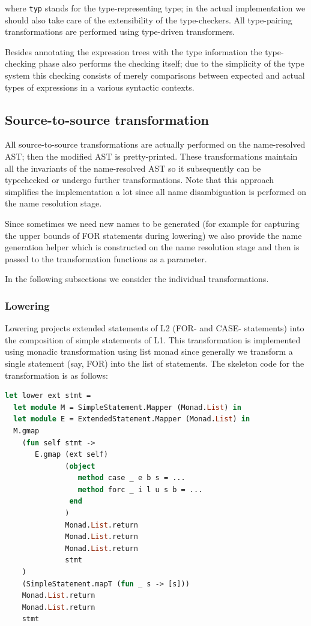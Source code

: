 where \lstinline{typ} stands for the type-representing type; in the actual implementation
we should also take care of the extensibility of the type-checkers. All type-pairing
transformations are performed using type-driven transformers.

Besides annotating the expression trees with the type information the type-checking 
phase also performs the checking itself; due to the simplicity of the type system
this checking consists of merely comparisons between expected and actual types of expressions
in a various syntactic contexts.

\subsection{Source-to-source transformation}

All source-to-source transformations are actually performed on the name-resolved AST; then
the modified AST is pretty-printed. These transformations maintain all the invariants of
the name-resolved AST so it subsequently can be typechecked or undergo further 
transformations. Note that this approach simplifies the implementation a lot since all name 
disambiguation is performed on the name resolution stage.

Since sometimes we need new names to be generated (for example for capturing the upper bounds of
FOR statements during lowering) we also provide the name generation helper which is constructed
on the name resolution stage and then is passed to the transformation functions as a parameter.

In the following subsections we consider the individual transformations.

\subsubsection{Lowering}

Lowering projects extended statements of L2 (FOR- and CASE- statements) into the composition
of simple statements of L1. This transformation is implemented using monadic transformation
using list monad since generally we transform a single statement (say, FOR) into the list
of statements. The skeleton code for the transformation is as follows:

\begin{lstlisting}[language=ocaml]
let lower ext stmt =
  let module M = SimpleStatement.Mapper (Monad.List) in 
  let module E = ExtendedStatement.Mapper (Monad.List) in
  M.gmap 
    (fun self stmt ->
       E.gmap (ext self)
              (object
                 method case _ e b s = ...
                 method forc _ i l u s b = ...
               end
              ) 
              Monad.List.return 
              Monad.List.return 
              Monad.List.return 
              stmt
    )
    (SimpleStatement.mapT (fun _ s -> [s])) 
    Monad.List.return 
    Monad.List.return
    stmt
\end{lstlisting}

